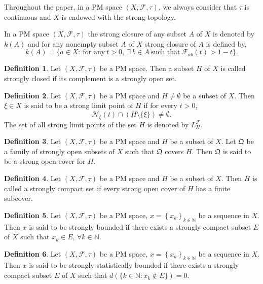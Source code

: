 \documentclass[reqno,b5paper]{amsart}
\theoremstyle{plain}
\theoremstyle{definition}
\newtheorem{defn}{Definition}[section]
\begin{document}
Throughout the paper, in a PM space $(X,\mathcal{F},\tau)$, we
always consider that $\tau$ is continuous and $X$ is endowed with
the strong topology.

In a PM space $(X,\mathcal{F},\tau)$ the strong closure of any
subset $A$ of $X$ is denoted by $k(A)$ and for any nonempty subset
$A$ of $X$ strong closure of $A$ is defined by,
$$k(A)=\{a\in X: ~\text{for any}~ t>0, ~\exists~ b\in A ~\text{such that}~\mathcal{F}_{ab}(t)>1-t\}.$$

\begin{defn}\cite{Du1}
Let $(X,\mathcal{F},\tau)$ be a PM space. Then a subset $H$ of $X$
is called strongly closed if its complement is a strongly open
set.
\end{defn}
\begin{defn}
Let $(X,\mathcal{F},\tau)$ be a PM space and $H\neq \emptyset$ be
a subset of $X$. Then $\xi\in X$ is said to be a strong limit
point of $H$ if for every $t>0$,
$$\mathcal{N}_\xi(t)\cap(H\setminus\{\xi\})\neq\emptyset.$$
The set of all strong limit points of the set $H$ is denoted by
$L_H^\mathcal{F}$.
\end{defn}
\begin{defn}\cite{Du1}
Let $(X,\mathcal{F},\tau)$ be a PM space and $H$ be a subset of
$X$. Let $\mathfrak{Q}$ be a family of strongly open subsets of
$X$ such that $\mathfrak{Q}$ covers $H$. Then $\mathfrak{Q}$ is
said to be a strong open cover for $H$.
\end{defn}
\begin{defn}\cite{Du1}
Let $(X,\mathcal{F},\tau)$ be a PM space and $H$ be a subset of
$X$. Then $H$ is called a strongly compact set if every strong
open cover of $H$ has a finite subcover.
\end{defn}
\begin{defn}\cite{Du1}
Let $(X,\mathcal{F},\tau)$ be a PM space,
$x=\left\{x_{k}\right\}_{k\in\mathbb N}$ be a sequence in $X$.
Then $x$ is said to be strongly bounded if there exists a strongly
compact subset $E$ of $X$ such that $x_k\in E$, $\forall
k\in\mathbb{N}$.
\end{defn}
\begin{defn}\cite{Du1}
Let $(X,\mathcal{F},\tau)$ be a PM space,
$x=\left\{x_{k}\right\}_{k\in\mathbb N}$ be a sequence in $X$.
Then $x$ is said to be strongly statistically bounded if there
exists a strongly compact subset $E$ of $X$ such that
$d(\{k\in\mathbb{N}:x_k\notin E\})=0$.
\end{defn}
\end{document}

